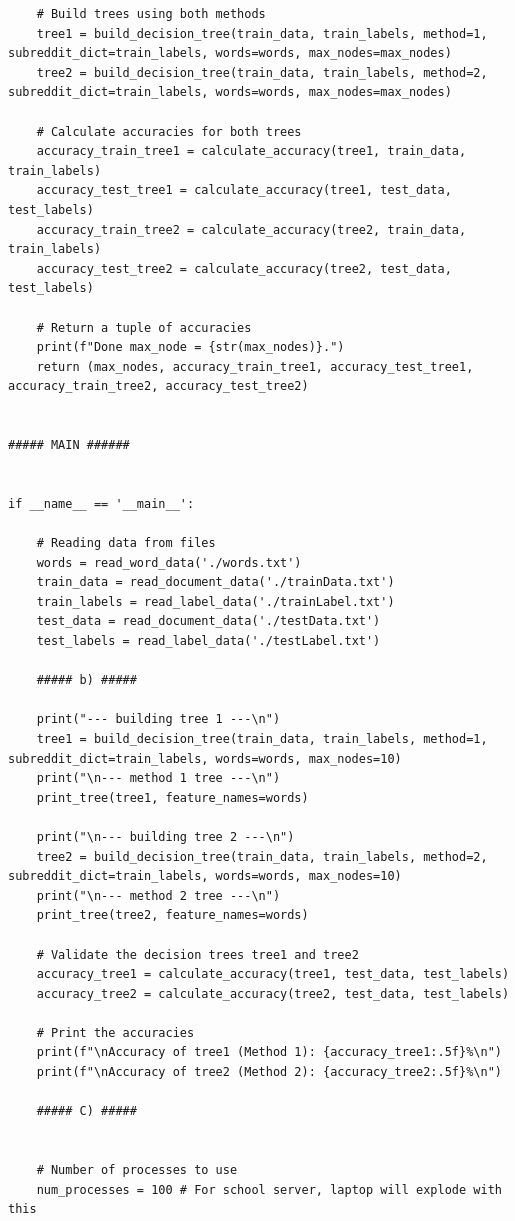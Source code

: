 \documentclass[10pt]{article}
\begin{document}
\begin{enumerate}
\begin{lstlisting}
    # Build trees using both methods
    tree1 = build_decision_tree(train_data, train_labels, method=1, subreddit_dict=train_labels, words=words, max_nodes=max_nodes)
    tree2 = build_decision_tree(train_data, train_labels, method=2, subreddit_dict=train_labels, words=words, max_nodes=max_nodes)
    
    # Calculate accuracies for both trees
    accuracy_train_tree1 = calculate_accuracy(tree1, train_data, train_labels)
    accuracy_test_tree1 = calculate_accuracy(tree1, test_data, test_labels)
    accuracy_train_tree2 = calculate_accuracy(tree2, train_data, train_labels)
    accuracy_test_tree2 = calculate_accuracy(tree2, test_data, test_labels)
    
    # Return a tuple of accuracies
    print(f"Done max_node = {str(max_nodes)}.")
    return (max_nodes, accuracy_train_tree1, accuracy_test_tree1, accuracy_train_tree2, accuracy_test_tree2)


##### MAIN ######


if __name__ == '__main__':
    
    # Reading data from files
    words = read_word_data('./words.txt')
    train_data = read_document_data('./trainData.txt')
    train_labels = read_label_data('./trainLabel.txt')
    test_data = read_document_data('./testData.txt')
    test_labels = read_label_data('./testLabel.txt')

    ##### b) #####

    print("--- building tree 1 ---\n")
    tree1 = build_decision_tree(train_data, train_labels, method=1, subreddit_dict=train_labels, words=words, max_nodes=10)
    print("\n--- method 1 tree ---\n")
    print_tree(tree1, feature_names=words)

    print("\n--- building tree 2 ---\n")
    tree2 = build_decision_tree(train_data, train_labels, method=2, subreddit_dict=train_labels, words=words, max_nodes=10)
    print("\n--- method 2 tree ---\n")
    print_tree(tree2, feature_names=words)
    
    # Validate the decision trees tree1 and tree2
    accuracy_tree1 = calculate_accuracy(tree1, test_data, test_labels)
    accuracy_tree2 = calculate_accuracy(tree2, test_data, test_labels)

    # Print the accuracies
    print(f"\nAccuracy of tree1 (Method 1): {accuracy_tree1:.5f}%\n")
    print(f"\nAccuracy of tree2 (Method 2): {accuracy_tree2:.5f}%\n")
    
    ##### C) #####
    
    
    # Number of processes to use
    num_processes = 100 # For school server, laptop will explode with this 


\end{lstlisting}
\end{enumerate}
\end{document}
